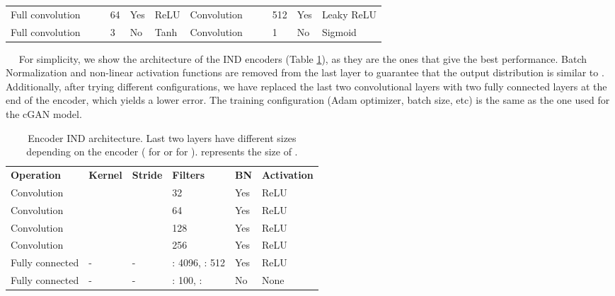 \documentclass{article}
\newcommand{\minisection}[1]{\vspace{0.04in} \noindent {\bf #1}\ \ }
\begin{document}
\begin{table}[ht]
\begin{adjustbox}{width=1.0\textwidth}
\begin{tabular}{llllll|llllll}
Full convolution   &       &       & 64               & Yes         & ReLU                & Convolution                     &                   &                   & 512                          & Yes                     & Leaky ReLU                      \\
Full convolution   &       &       & 3                & No          & Tanh                & Convolution                     &                   &                   & 1                            & No                      & Sigmoid                        
\end{tabular}
\end{adjustbox}
\end{table}
\minisection{Encoder}
For simplicity, we show the architecture of the IND encoders (Table \ref{tab:enc_arch}), as they are the ones that give the best performance. Batch Normalization and non-linear activation functions are removed from the last layer to guarantee that the output distribution is similar to . Additionally, after trying different configurations, we have replaced the last two convolutional layers with two fully connected layers at the end of the encoder, which yields a lower error. The training configuration (Adam optimizer, batch size, etc) is the same as the one used for the cGAN model.  

\begin{table}[ht]
\centering
\caption{Encoder IND architecture. Last two layers have different sizes depending on the encoder ( for  or  for ).  represents the size of .} 
\label{tab:enc_arch}
\begin{adjustbox}{width=0.6\textwidth}
\begin{tabular}{llllll}
\textbf{Operation} & \textbf{Kernel} & \textbf{Stride} & \textbf{Filters} & \textbf{BN} & \textbf{Activation} \\
Convolution        &       &       & 32               & Yes         & ReLU                \\
Convolution        &       &       & 64              & Yes         & ReLU                \\
Convolution        &       &       & 128              & Yes         & ReLU                \\
Convolution        &       &       & 256              & Yes         & ReLU                \\
Fully connected    & -               & -               & : 4096, : 512           & Yes         & ReLU                \\
Fully connected    & -               & -               & : 100, :                 & No          & None      \\
\end{tabular}
\end{adjustbox}
\end{table} 
\end{document}
